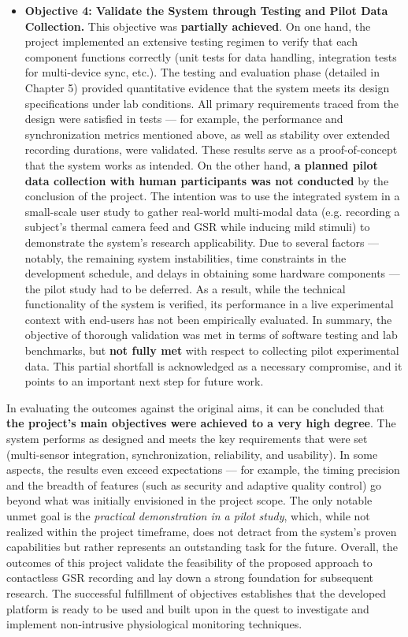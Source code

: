 \begin{itemize}
\item \textbf{Objective 4: Validate the System through Testing and Pilot Data
  Collection.} This objective was \textbf{partially achieved}. On one hand,
  the project implemented an extensive testing regimen to verify that
  each component functions correctly (unit tests for data handling,
  integration tests for multi-device sync, etc.). The testing and
  evaluation phase (detailed in Chapter 5) provided quantitative
  evidence that the system meets its design specifications under lab
  conditions. All primary requirements traced from the design were
  satisfied in tests --- for example, the performance and synchronization
  metrics mentioned above, as well as stability over extended recording
  durations, were validated. These results serve as a proof-of-concept
  that the system works as intended. On the other hand, \textbf{a planned
  pilot data collection with human participants was not conducted} by
  the conclusion of the project. The intention was to use the integrated
  system in a small-scale user study to gather real-world multi-modal
  data (e.g. recording a subject's thermal camera feed and GSR while
  inducing mild stimuli) to demonstrate the system's research
  applicability. Due to several factors --- notably, the remaining system
  instabilities, time constraints in the development schedule, and
  delays in obtaining some hardware components --- the pilot study had to
  be deferred. As a result, while the technical functionality of the
  system is verified, its performance in a live experimental context
  with end-users has not been empirically evaluated. In summary, the
  objective of thorough validation was met in terms of software testing
  and lab benchmarks, but \textbf{not fully met} with respect to collecting
  pilot experimental data. This partial shortfall is acknowledged as a
  necessary compromise, and it points to an important next step for
  future work.

\end{itemize}
In evaluating the outcomes against the original aims, it can be
concluded that \textbf{the project's main objectives were achieved to a very
high degree}. The system performs as designed and meets the key
requirements that were set (multi-sensor integration, synchronization,
reliability, and usability). In some aspects, the results even exceed
expectations --- for example, the timing precision and the breadth of
features (such as security and adaptive quality control) go beyond what
was initially envisioned in the project scope. The only notable unmet
goal is the \textit{practical demonstration in a pilot study}, which, while not
realized within the project timeframe, does not detract from the
system's proven capabilities but rather represents an outstanding task
for the future. Overall, the outcomes of this project validate the
feasibility of the proposed approach to contactless GSR recording and
lay down a strong foundation for subsequent research. The successful
fulfillment of objectives establishes that the developed platform is
ready to be used and built upon in the quest to investigate and
implement non-intrusive physiological monitoring techniques.

